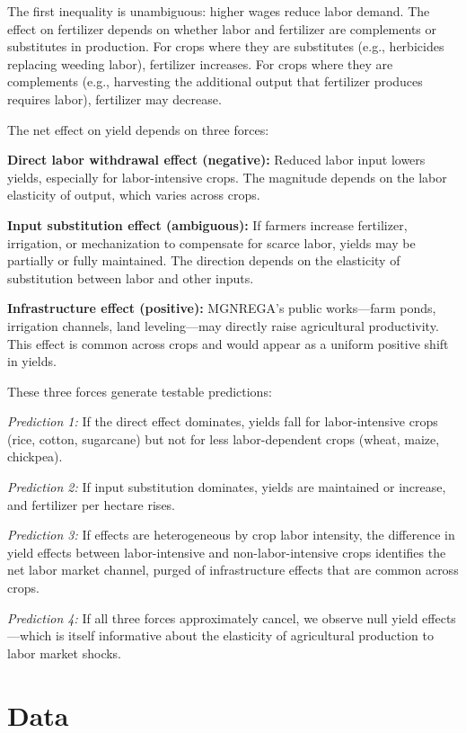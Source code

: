 \documentclass[12pt]{article}
\begin{document}
The first inequality is unambiguous: higher wages reduce labor demand. The effect on fertilizer depends on whether labor and fertilizer are complements or substitutes in production. For crops where they are substitutes (e.g., herbicides replacing weeding labor), fertilizer increases. For crops where they are complements (e.g., harvesting the additional output that fertilizer produces requires labor), fertilizer may decrease.

The net effect on yield depends on three forces:

\textbf{Direct labor withdrawal effect (negative):} Reduced labor input lowers yields, especially for labor-intensive crops. The magnitude depends on the labor elasticity of output, which varies across crops.

\textbf{Input substitution effect (ambiguous):} If farmers increase fertilizer, irrigation, or mechanization to compensate for scarce labor, yields may be partially or fully maintained. The direction depends on the elasticity of substitution between labor and other inputs.

\textbf{Infrastructure effect (positive):} MGNREGA's public works---farm ponds, irrigation channels, land leveling---may directly raise agricultural productivity. This effect is common across crops and would appear as a uniform positive shift in yields.

These three forces generate testable predictions:

\textit{Prediction 1:} If the direct effect dominates, yields fall for labor-intensive crops (rice, cotton, sugarcane) but not for less labor-dependent crops (wheat, maize, chickpea).

\textit{Prediction 2:} If input substitution dominates, yields are maintained or increase, and fertilizer per hectare rises.

\textit{Prediction 3:} If effects are heterogeneous by crop labor intensity, the difference in yield effects between labor-intensive and non-labor-intensive crops identifies the net labor market channel, purged of infrastructure effects that are common across crops.

\textit{Prediction 4:} If all three forces approximately cancel, we observe null yield effects---which is itself informative about the elasticity of agricultural production to labor market shocks.

\section{Data}
\end{document}
